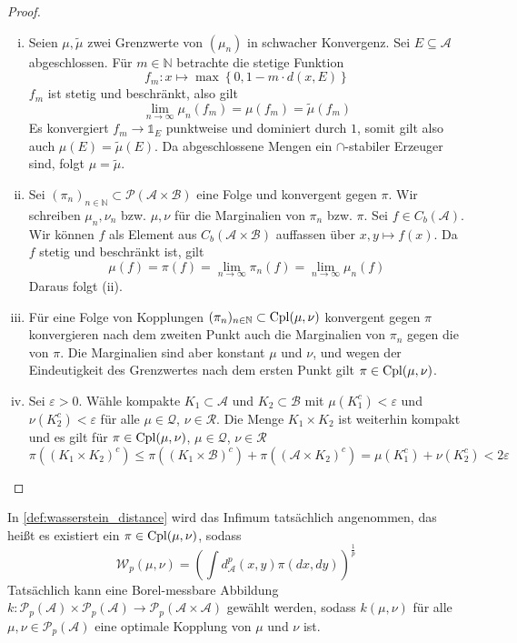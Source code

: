 \begin{proof}
\begin{enumerate}[(i)]
    \item Seien $\mu, \tilde{\mu}$ zwei Grenzwerte von $(\mu_n)$ in schwacher Konvergenz. Sei $E \subseteq \mathcal{A}$ abgeschlossen. Für $m \in \mathbb{N}$ betrachte die stetige Funktion 
    $$f_m: x \mapsto \max\left\{0, 1-m\cdot d(x,E)\right\}$$
    $f_m$ ist stetig und beschränkt, also gilt 
    $$\lim_{n \rightarrow \infty} \mu_n(f_m) = \mu(f_m) = \tilde{\mu}(f_m)$$
    Es konvergiert $f_m \rightarrow \mathds{1}_E$ punktweise und dominiert durch $1$, somit gilt also auch $\mu(E) =\tilde{\mu}(E)$. Da abgeschlossene Mengen ein $\cap$-stabiler Erzeuger sind, folgt $\mu=\tilde{\mu}$.

    \item Sei $(\pi_n)_{n\in\mathbb{N}} \subset \mathcal{P}(\mathcal{A}\times\mathcal{B})$ eine Folge und konvergent gegen $\pi$. Wir schreiben $\mu_n, \nu_n$ bzw. $\mu, \nu$ für die Marginalien von $\pi_n$ bzw. $\pi$. Sei $f\in C_b(\mathcal{A})$. Wir können $f$ als Element aus $C_b(\mathcal{A}\times\mathcal{B})$ auffassen über $x,y\mapsto f(x)$. Da $f$ stetig und beschränkt ist, gilt 
    $$\mu(f) = \pi(f) = \lim_{n\rightarrow \infty} \pi_n(f) = \lim_{n\rightarrow\infty} \mu_n(f)$$ 
    Daraus folgt (ii).

    \item Für eine Folge von Kopplungen $(\pi_n)_{n\in\mathbb{N}} \subset \operatorname{Cpl}(\mu,\nu)$ konvergent gegen $\pi$ konvergieren nach dem zweiten Punkt auch die Marginalien von $\pi_n$ gegen die von $\pi$. Die Marginalien sind aber konstant $\mu$ und $\nu$, und wegen der Eindeutigkeit des Grenzwertes nach dem ersten Punkt gilt $\pi \in \operatorname{Cpl}(\mu,\nu)$.

    \item Sei $\varepsilon > 0$. Wähle kompakte $K_1 \subset \mathcal{A}$ und $K_2 \subset \mathcal{B}$ mit $\mu(K_1^c)<\varepsilon$ und $\nu(K_2^c) < \varepsilon$ für alle $\mu \in \mathcal{Q}$, $\nu \in \mathcal{R}$. Die Menge $K_1 \times K_2$ ist weiterhin kompakt und es gilt für $\pi \in \operatorname{Cpl}(\mu,\nu)$, $\mu \in \mathcal{Q}$, $\nu\in\mathcal{R}$
    $$\pi((K_1\times K_2)^c) \leq \pi((K_1 \times \mathcal{B})^c) + \pi((\mathcal{A} \times K_2)^c) = \mu(K_1^c) + \nu(K_2^c) < 2\varepsilon$$
\end{enumerate}
\end{proof}
\begin{lemma}\label{thm:optimal_coupling}
In \ref{def:wasserstein_distance} wird das Infimum tatsächlich angenommen, das heißt es existiert ein $\pi \in \operatorname{Cpl}(\mu, \nu)$, sodass
$$\mathcal{W}_p(\mu, \nu) = \left( \int d^p_\mathcal{A}(x, y) \pi(dx, dy) \right)^{\frac{1}{p}}$$
Tatsächlich kann eine Borel-messbare Abbildung $k: \mathcal{P}_p(\mathcal{A}) \times \mathcal{P}_p(\mathcal{A}) \rightarrow \mathcal{P}_p(\mathcal{A}\times \mathcal{A})$ gewählt werden, sodass $k(\mu,\nu)$ für alle $\mu,\nu \in \mathcal{P}_p(\mathcal{A})$ eine optimale Kopplung von $\mu$ und $\nu$ ist.
\end{lemma}
